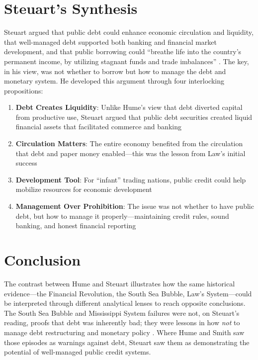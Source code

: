 \documentclass[12pt]{article}
\begin{document}
\section{Steuart's Synthesis}

Steuart argued that public debt could enhance economic circulation and liquidity, that well-managed debt supported both banking and financial market development, and that public borrowing could ``breathe life into the country's permanent income, by utilizing stagnant funds and trade imbalances'' \citep{stettner1945}. The key, in his view, was not whether to borrow but how to manage the debt and monetary system. He developed this argument through four interlocking propositions:

\begin{enumerate}
\item \textbf{Debt Creates Liquidity}: Unlike Hume's view that debt diverted capital from productive use, Steuart argued that public debt securities created liquid financial assets that facilitated commerce and banking

\item \textbf{Circulation Matters}: The entire economy benefited from the circulation that debt and paper money enabled---this was the lesson from Law's initial success

\item \textbf{Development Tool}: For ``infant'' trading nations, public credit could help mobilize resources for economic development

\item \textbf{Management Over Prohibition}: The issue was not whether to have public debt, but how to manage it properly---maintaining credit rules, sound banking, and honest financial reporting
\end{enumerate}

\section{Conclusion}

The contrast between Hume and Steuart illustrates how the same historical evidence---the Financial Revolution, the South Sea Bubble, Law's System---could be interpreted through different analytical lenses to reach opposite conclusions. The South Sea Bubble and Mississippi System failures were not, on Steuart's reading, proofs that debt was inherently bad; they were lessons in how \textit{not} to manage debt restructuring and monetary policy \citep{menudo2019}. Where Hume and Smith saw those episodes as warnings against debt, Steuart saw them as demonstrating the potential of well-managed public credit systems.
\end{document}
